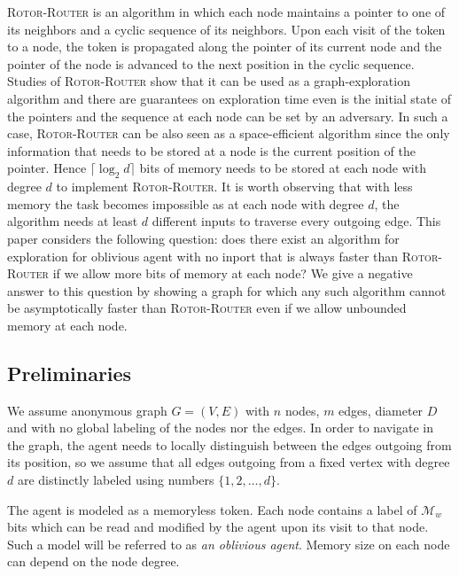 \documentclass{article}[11pt,letter]
\newcommand{\RR}{{\textsc{Rotor-Router}}\xspace}
\newcommand{\mem}{\mathcal{M}}
\begin{document}
\RR is an algorithm in which each node maintains a pointer to one of its neighbors and a cyclic sequence of its neighbors. Upon each visit of the token to a node, the token is propagated along the pointer of its current node and the pointer of the node is advanced to the next position in the cyclic sequence. Studies of \RR show that it can be used as a graph-exploration algorithm and there are guarantees on exploration time even is the initial state of the pointers and the sequence at each node can be set by an adversary. In such a case, \RR can be also seen as a space-efficient algorithm since the only information that needs to be stored at a node is the current position of the pointer. Hence $\lceil \log_2 d \rceil$ bits of memory needs to be stored at each node with degree $d$ to implement \RR. It is worth observing that with less memory the task becomes impossible as at each node with degree $d$, the algorithm needs at least $d$ different inputs to traverse every outgoing edge. This paper considers the following question: does there exist an algorithm for exploration for oblivious agent with no inport that is always faster than \RR if we allow more bits of memory at each node? We give a negative answer to this question by showing a graph for which any such algorithm cannot be asymptotically faster than \RR even if we allow unbounded memory at each node.









\subsection{Preliminaries}
We assume anonymous graph $G = (V,E)$ with $n$ nodes, $m$ edges, diameter $D$ and with no global labeling of the nodes nor the edges. In order to navigate in the graph, the agent needs to locally distinguish between the edges outgoing from its position, so we assume that all edges outgoing from a fixed vertex with degree $d$ are distinctly labeled using numbers $\{1,2,\dots,d\}$. 

The agent is modeled as a memoryless token. Each node contains a label of $\mem_w$ bits which can be read and modified by the agent upon its visit to that node. Such a model will be referred to as \emph{an oblivious agent}. Memory size on each node can depend on the node degree.
\end{document}
